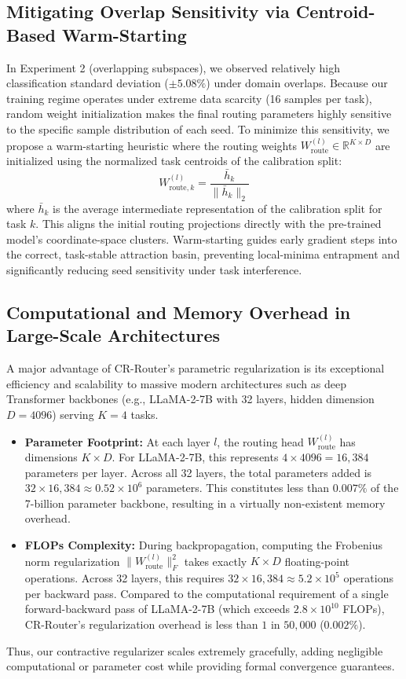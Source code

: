 \documentclass{article}
\theoremstyle{plain}
\theoremstyle{definition}
\theoremstyle{remark}
\begin{document}
\subsection{Mitigating Overlap Sensitivity via Centroid-Based Warm-Starting}
In Experiment 2 (overlapping subspaces), we observed relatively high classification standard deviation ($\pm 5.08\%$) under domain overlaps. Because our training regime operates under extreme data scarcity (16 samples per task), random weight initialization makes the final routing parameters highly sensitive to the specific sample distribution of each seed. 
To minimize this sensitivity, we propose a warm-starting heuristic where the routing weights $W_{\text{route}}^{(l)} \in \mathbb{R}^{K \times D}$ are initialized using the normalized task centroids of the calibration split:
\begin{equation}
W_{\text{route}, k}^{(l)} = \frac{\bar{h}_k}{\|\bar{h}_k\|_2}
\end{equation}
where $\bar{h}_k$ is the average intermediate representation of the calibration split for task $k$. This aligns the initial routing projections directly with the pre-trained model's coordinate-space clusters. Warm-starting guides early gradient steps into the correct, task-stable attraction basin, preventing local-minima entrapment and significantly reducing seed sensitivity under task interference.

\subsection{Computational and Memory Overhead in Large-Scale Architectures}
A major advantage of CR-Router's parametric regularization is its exceptional efficiency and scalability to massive modern architectures such as deep Transformer backbones (e.g., LLaMA-2-7B with 32 layers, hidden dimension $D = 4096$) serving $K = 4$ tasks.
\begin{itemize}
  \item \textbf{Parameter Footprint:} At each layer $l$, the routing head $W_{\text{route}}^{(l)}$ has dimensions $K \times D$. For LLaMA-2-7B, this represents $4 \times 4096 = 16,384$ parameters per layer. Across all 32 layers, the total parameters added is $32 \times 16,384 \approx 0.52 \times 10^6$ parameters. This constitutes less than $0.007\%$ of the 7-billion parameter backbone, resulting in a virtually non-existent memory overhead.
  \item \textbf{FLOPs Complexity:} During backpropagation, computing the Frobenius norm regularization $\|W_{\text{route}}^{(l)}\|_F^2$ takes exactly $K \times D$ floating-point operations. Across 32 layers, this requires $32 \times 16,384 \approx 5.2 \times 10^5$ operations per backward pass. Compared to the computational requirement of a single forward-backward pass of LLaMA-2-7B (which exceeds $2.8 \times 10^{10}$ FLOPs), CR-Router's regularization overhead is less than $1$ in $50,000$ ($0.002\%$).
\end{itemize}
Thus, our contractive regularizer scales extremely gracefully, adding negligible computational or parameter cost while providing formal convergence guarantees.
\end{document}
